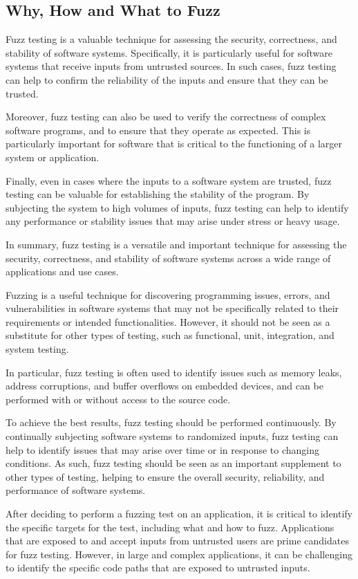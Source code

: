 \subsection{Why, How and What to Fuzz}

Fuzz testing is a valuable technique for assessing the security, correctness,
and stability of software systems. Specifically, it is particularly useful for
software systems that receive inputs from untrusted sources. In such cases,
fuzz testing can help to confirm the reliability of the inputs and ensure that
they can be trusted.

Moreover, fuzz testing can also be used to verify the correctness of complex
software programs, and to ensure that they operate as expected. This is
particularly important for software that is critical to the functioning of a
larger system or application.

Finally, even in cases where the inputs to a software system are trusted,
fuzz testing can be valuable for establishing the stability of the program.
By subjecting the system to high volumes of inputs, fuzz testing can help to
identify any performance or stability issues that may arise under stress or heavy usage.

In summary, fuzz testing is a versatile and important technique for assessing
the security, correctness, and stability of software systems across a wide
range of applications and use cases.

Fuzzing is a useful technique for discovering programming issues,
errors, and vulnerabilities in software systems that may not be
specifically related to their requirements or intended functionalities.
However, it should not be seen as a substitute for other types of testing,
such as functional, unit, integration, and system testing.

In particular, fuzz testing is often used to identify issues such as memory leaks,
address corruptions, and buffer overflows on embedded devices, and can be
performed with or without access to the source code.

To achieve the best results, fuzz testing should be performed continuously.
By continually subjecting software systems to randomized inputs, fuzz testing
can help to identify issues that may arise over time or in response to changing
conditions. As such, fuzz testing should be seen as an important supplement to
other types of testing, helping to ensure the overall security, reliability,
and performance of software systems.

After deciding to perform a fuzzing test on an application, it is critical
to identify the specific targets for the test, including what and how to fuzz.
Applications that are exposed to and accept inputs from untrusted users are
prime candidates for fuzz testing. However, in large and complex applications,
it can be challenging to identify the specific code paths that are exposed to
untrusted inputs.

